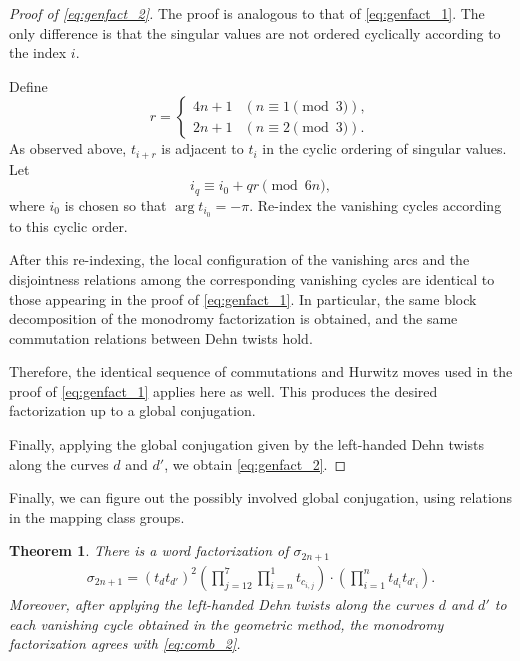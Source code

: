 \documentclass[10pt,a4paper,reqno]{amsart}
\newtheorem{thm}{Theorem}[section]
\theoremstyle{definition}
\numberwithin{equation}{section}
\numberwithin{figure}{section}
\begin{document}
\begin{proof}[Proof of \eqref{eq:genfact_2}]
The proof is analogous to that of \eqref{eq:genfact_1}.
The only difference is that the singular values are not ordered cyclically according to the index $i$.

Define
\[
r=
\begin{cases}
4n+1 & (n\equiv 1 \pmod 3),\\
2n+1 & (n\equiv 2 \pmod 3).
\end{cases}
\]
As observed above, $t_{i+r}$ is adjacent to $t_i$ in the cyclic ordering of singular values.
Let
\[
i_q \equiv i_0+qr \pmod{6n},
\]
where $i_0$ is chosen so that $\arg t_{i_0}=-\pi$.
Re-index the vanishing cycles according to this cyclic order.

After this re-indexing, the local configuration of the vanishing arcs and the disjointness relations among the corresponding vanishing cycles are identical to those appearing in the proof of \eqref{eq:genfact_1}.
In particular, the same block decomposition of the monodromy factorization is obtained, and the same commutation relations between Dehn twists hold.

Therefore, the identical sequence of commutations and Hurwitz moves used in the proof of \eqref{eq:genfact_1} applies here as well.
This produces the desired factorization up to a global conjugation.

Finally, applying the global conjugation given by the left-handed Dehn twists along the curves $d$ and $d'$, we obtain \eqref{eq:genfact_2}.
\end{proof}

Finally, we can figure out the possibly involved global conjugation, using relations in the mapping class groups.
\begin{thm}\label{thm:comb_2}
There is a word factorization of $\sigma_{2n+1}$
\begin{align} \label{eq:comb_2}
\sigma_{2n+1}=(t_{d} t_{d'})^2 \left(\prod_{j=12}^7 \prod_{i=n}^1 t_{c_{i,j}} \right) \cdot \left( \prod_{i=1}^n t_{d_{i}}t_{d'_{i}} \right).
\end{align}
Moreover, after applying the left-handed Dehn twists along the curves $d$ and $d'$ to each vanishing cycle obtained in the geometric method,
the monodromy factorization agrees with \eqref{eq:comb_2}.
\end{thm}
\end{document}
